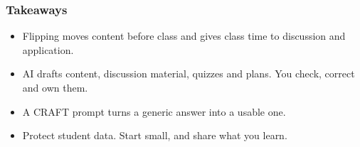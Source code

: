 \begin{frame}[fragile]\frametitle{Takeaways}
\begin{itemize}
\item Flipping moves content before class and gives class time to discussion and application.
\item AI drafts content, discussion material, quizzes and plans. You check, correct and own them.
\item A CRAFT prompt turns a generic answer into a usable one.
\item Protect student data. Start small, and share what you learn.
\end{itemize}
\end{frame}
